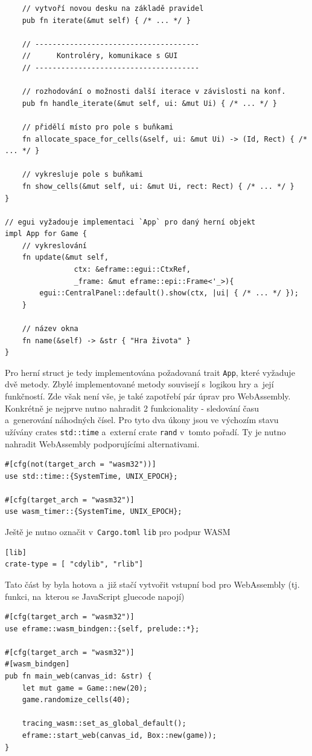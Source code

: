 \documentclass[a4paper, 12pt]{article} %
\newcommand{\rust}[1]{\texttt{#1}}
\begin{document}
\begin{verbatim}
    // vytvoří novou desku na základě pravidel
    pub fn iterate(&mut self) { /* ... */ }

    // --------------------------------------
    //      Kontroléry, komunikace s GUI
    // --------------------------------------

    // rozhodování o možnosti další iterace v závislosti na konf.
    pub fn handle_iterate(&mut self, ui: &mut Ui) { /* ... */ }

    // přidělí místo pro pole s buňkami
    fn allocate_space_for_cells(&self, ui: &mut Ui) -> (Id, Rect) { /* ... */ }

    // vykresluje pole s buňkami
    fn show_cells(&mut self, ui: &mut Ui, rect: Rect) { /* ... */ }
}

// egui vyžadouje implementaci `App` pro daný herní objekt
impl App for Game {
    // vykreslování
    fn update(&mut self,
                ctx: &eframe::egui::CtxRef,
                _frame: &mut eframe::epi::Frame<'_>){
        egui::CentralPanel::default().show(ctx, |ui| { /* ... */ });
    }

    // název okna
    fn name(&self) -> &str { "Hra života" }
}
        \end{verbatim}
        
        Pro herní struct je tedy implementována požadovaná trait \rust{App}, které vyžaduje dvě metody. Zbylé implementované metody souvisejí s~logikou hry a~její funkčností. Zde však není vše, je také zapotřebí pár úprav pro WebAssembly. Konkrétně je nejprve nutno nahradit 2 funkcionality - sledování času a~generování náhodných čísel. Pro tyto dva úkony jsou ve výchozím stavu užívány crates \rust{std::time} a~externí crate \rust{rand} v~tomto pořadí. Ty je nutno nahradit WebAssembly podporujícími alternativami.
        \begin{verbatim}
#[cfg(not(target_arch = "wasm32"))]
use std::time::{SystemTime, UNIX_EPOCH};

#[cfg(target_arch = "wasm32")]
use wasm_timer::{SystemTime, UNIX_EPOCH};
        \end{verbatim}
        
        Ještě je nutno označit v~\texttt{Cargo.toml} \texttt{lib} pro podpur WASM
        \begin{verbatim}
[lib]
crate-type = [ "cdylib", "rlib"]
        \end{verbatim}
        
        Tato část by byla hotova a~již stačí vytvořit vstupní bod pro WebAssembly (tj. funkci, na~kterou se JavaScript gluecode napojí)
        \begin{verbatim}
#[cfg(target_arch = "wasm32")]
use eframe::wasm_bindgen::{self, prelude::*};

#[cfg(target_arch = "wasm32")]
#[wasm_bindgen]
pub fn main_web(canvas_id: &str) {
    let mut game = Game::new(20);
    game.randomize_cells(40);

    tracing_wasm::set_as_global_default();
    eframe::start_web(canvas_id, Box::new(game));
}
        \end{verbatim}
        
\end{document}
